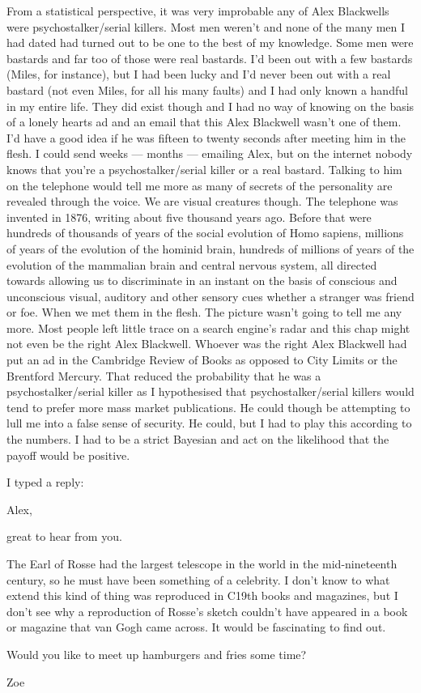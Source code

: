From a statistical perspective, it was very improbable any of Alex
Blackwells were psychostalker/serial killers. Most men weren't and
none of the many men I had dated had turned out to be one to the
best of my knowledge. Some men were bastards and far too of those
were {\twelveit real\/} bastards. I'd been out with a few bastards
(Miles, for instance), but I had been lucky and I'd never been out
with a real bastard (not even Miles, for all his many faults) and I
had only known a handful in my entire life. They did exist though
and I had no way of knowing on the basis of a lonely hearts ad and
an email that this Alex Blackwell wasn't one of them. I'd have a
good idea if he was fifteen to twenty seconds after meeting him in
the flesh. I could send weeks --- months --- emailing Alex, but on
the internet nobody knows that you're a psychostalker/serial killer
or a real bastard. Talking to him on the telephone would tell me
more as many of secrets of the personality are revealed through the
voice. We are visual creatures though. The telephone was invented in
1876, writing about five thousand years ago. Before that were
hundreds of thousands of years of the social evolution of {\twelveit
Homo sapiens\/}, millions of years of the evolution of the hominid brain,
hundreds of millions of years of the evolution of the mammalian
brain and central nervous system, all directed towards allowing us
to discriminate in an instant on the basis of conscious and
unconscious visual, auditory and other sensory cues whether a
stranger was friend or foe. When we met them in the flesh. The
picture wasn't going to tell me any  more. Most people left little
trace on a search engine's radar and this chap might not even be the right
Alex Blackwell. Whoever was the right Alex Blackwell had put an ad
in the {\twelvesl Cambridge Review of Books\/} as opposed to
{\twelvesl City Limits\/} or the {\twelvesl Brentford Mercury}. That
reduced the probability that he was a psychostalker/serial killer as
I hypothesised that psychostalker/serial killers would tend to
prefer more mass market publications. He could though be attempting
to lull me into a false sense of security. He could, but I had to
play this according to the numbers. I had to be a strict Bayesian
and act on the likelihood that the payoff would be positive.

I typed a reply:

{\twelvett\obeylines
Alex,

great to hear from you.

The Earl of Rosse had the largest telescope in the world in the
mid-nineteenth century, so he must have been something of a
celebrity. I don't know to what extend this kind of thing was
reproduced in C19th books and magazines, but I don't see why a
reproduction of Rosse's sketch couldn't have appeared in a book or
magazine that van Gogh came across. It would be fascinating to find
out.

Would you like to meet up hamburgers and fries some time?

Zoe}


